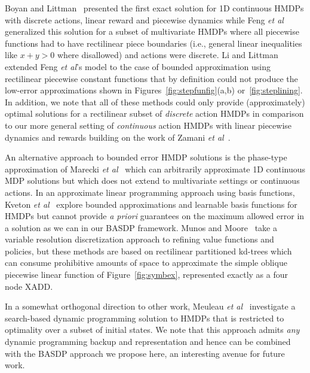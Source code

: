 Boyan and Littman~\cite{boyan01} presented the first exact solution
for 1D continuous HMDPs with discrete actions, linear reward and
piecewise dynamics while Feng {\it et al}~\cite{feng04} generalized
this solution for a subset of multivariate HMDPs where all piecewise
functions had to have rectilinear piece boundaries (i.e., general
linear inequalities like $x + y > 0$ where disallowed) and actions
were discrete.  Li and Littman~\cite{li05} extended Feng {\it et al}'s
model to the case of bounded approximation using rectilinear piecewise
constant functions that by definition could not produce
the low-error approximations shown in Figures~\ref{fig:stepfunfig}(a,b)
or~\ref{fig:steplining}.  In addition, we note that all of these methods
could only provide (approximately) optimal solutions for a rectilinear
subset of \emph{discrete} action HMDPs in comparison to our
more general setting of \emph{continuous} action HMDPs with 
linear piecewise dynamics and rewards building on the work of Zamani
{\it et al}~\cite{zamani12}.  

An alternative approach to bounded error HMDP solutions is the phase-type
approximation of Marecki {\it et al}~\cite{phase07} which can
arbitrarily approximate 1D continuous MDP solutions but which does not
extend to multivariate settings or continuous actions.
In an approximate linear programming approach using basis functions, 
Kveton {\it et al}~\cite{kveton06,kveton06aaai} explore bounded
approximations and learnable basis functions for HMDPs but cannot provide 
\emph{a priori} guarantees on the maximum allowed error in a solution
as we can in our BASDP framework.  Munos and Moore~\cite{munos02} take
a variable resolution discretization approach to refining value
functions and policies, but these methods are based on rectilinear
partitioned kd-trees which can consume
prohibitive amounts of space to approximate the simple oblique
piecewise linear function of Figure~\ref{fig:symbex}, 
represented exactly as a four node XADD.

In a somewhat orthogonal direction to other work, Meuleau {\it et
al}~\cite{hao09} investigate a search-based dynamic programming
solution to HMDPs that is restricted to optimality over a subset of
initial states.  We note that this approach admits \emph{any} dynamic
programming backup and representation and hence can be combined with
the BASDP approach we propose here, an interesting avenue for future
work.

